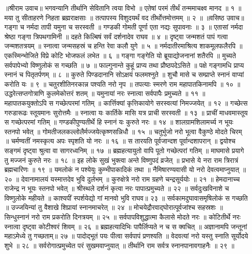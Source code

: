 ॥श्रीराम उवाच॥
भगवन्यानि तीर्थानि सेवितानि त्वया विभो ॥
एतेषां परमं तीर्थं तन्ममाचक्ष्व मानद ॥ १ ॥
मया तु सीताहरणे निहता ब्रह्मराक्षसाः ॥
तत्पापस्य विशुदयर्थं वद तीर्थोत्तमोत्तमम् ॥ २ ॥
॥वसिष्ठ उवाच॥
गङ्गा च नर्मदा तापी यमुना च सरस्वती ॥
गण्डकी गोमती पूर्णा एता नद्यः सुपावनाः ॥ ३ ॥
एतासां नर्मदा श्रेष्ठा गङ्गा त्रिपथगामिनी ॥
दहते किल्बिषं सर्वं दर्शनादेव राघव ॥ ४ ॥
दृष्ट्वा जन्मशतं पापं गत्वा जन्मशतत्रयम् ॥
स्नात्वा जन्मसहस्रं च हन्ति रेवा कलौ युगे ॥ ५ ॥
नर्मदातीरमाश्रित्य शाकमूलफलैरपि ॥
एकस्मिन्भोजिते विप्रे कोटि भोजफलं लभेत ॥ ६ ॥
गङ्गा गङ्गेति यो ब्रूयाद्योजनानां शतैरपि ॥
मुच्यते सर्वपापेभ्यो विष्णुलोकं स गच्छति ॥ ७ ॥
फाल्गुनान्ते कुहूं प्राप्य तथा प्रौष्ठपदेऽसिते ॥
पक्षे गङ्गामधि प्राप्य स्नानं च पितृतर्पणम् ॥ ८ ॥
कुरुते पिण्डदानानि सोऽक्षयं फलमश्नुते ॥
शुचौ मासे च सम्प्राप्ते स्नानं वाप्यां करोति यः ॥ ९ ॥
चतुरशीतिनरकान्न पश्यति नरो नृप ॥
तपत्याः स्मरणे राम महापातकिनामपि ॥ १० ॥
उद्धरेत्सप्तगोत्राणि कुलमेकोत्तरं शतम् ॥
यमुनायां नरः स्नात्वा सर्वपापैः प्रमुच्यते ॥ ११ ॥
महापातकयुक्तोऽपि स गच्छेत्परमां गतिम् ॥
कार्त्तिक्यां कृत्तिकायोगे सरस्वत्यां निमज्जयेत् ॥ १२ ॥
गच्छेत्स गरुडारूढः स्तूयमानः सुरोत्तमैः ॥
स्नात्वा यः कार्तिके मासि यत्र प्राची सरस्वती ॥ १३ ॥
प्राचीं माधवमास्तूय स गच्छेत्परमां गतिम् ॥
गण्डकीपुण्यतीर्थे हि स्नानं यः कुरुते नरः ॥ १४ ॥
शालग्रामशिलामर्च्य न भूयः स्तनपो भवेत् ॥
गोमतीजलकल्लोलैर्मज्जयेत्कृष्णसन्निधौ ॥ १५ ॥
चतुर्भुजो नरो भूत्वा वैकुण्ठे मोदते चिरम् ॥
चर्मण्वतीं नमस्कृत्य अपः स्पृशति यो नरः ॥ १६ ॥
स तारयति पूर्वजान्दश पूर्वान्दशापरान् ॥
द्वयोश्च सङ्गमं दृष्ट्वा श्रुत्वा वा सागरध्वनिम् ॥ १७ ॥
ब्रह्महत्यायुतो वापि पूतो गच्छेत्परां गतिम् ॥
माघमासे प्रयागे तु मज्जनं कुरुते नरः ॥ १८ ॥
इह लोके सुखं भुक्त्वा अन्ते विष्णुपदं व्रजेत् ॥
प्रभासे ये नरा राम त्रिरात्रं ब्रह्मचारिणः ॥ १९ ॥
यमलोकं न पश्येयुः कुम्भीपाकादिकं तथा ॥
नैमिषारण्यवासी यो नरो देवत्वमाप्नुयात् ॥ २० ॥
देवानामालयं यस्मात्तदेव भुवि दुर्लभम् ॥
कुरुक्षेत्रे नरो राम ग्रहणे चन्द्रसूर्ययोः ॥ २१ ॥
हेमदानाच्च राजेन्द्र न भूयः स्तनपो भवेत् ॥
श्रीस्थले दर्शनं कृत्वा नरः पापात्प्रमुच्यते ॥ २२ ॥
सर्वदुःखविनाशे च विष्णुलोके महीयते ॥
काश्यपीं स्पर्शयेद्यो गां मानवो भुवि राघव॥ २३ ॥
सर्वकामदुघावासमृषिलोकं स गच्छति ॥
उज्जयिन्यां तु वैशाखे शिप्रायां स्नानमाचरेत् ॥ २४ ॥
मोचयेद्रौरवाद्घोरात्पूर्वजांश्च सहस्रशः ॥
सिन्धुस्नानं नरो राम प्रकरोति दिनत्रयम् ॥ २५ ॥
सर्वपापविशुद्धात्मा कैलासे मोदते नरः ॥
कोटितीर्थे नरः स्नात्वा दृष्ट्वा कोटीश्वरं शिवम् ॥ २६ ॥
ब्रह्महत्यादिभिः पापैर्लिप्यते न च स क्वचित् ॥
अज्ञानामपि जन्तूनां महाऽमेध्ये तु गच्छताम्॥ २७ ॥
पादोद्भूतं पयः पीत्वा सर्वपापं प्रणश्यति ॥
वेदवत्यां नरो यस्तु स्नाति सूर्योदये शुभे ॥ २८ ॥
सर्वरोगात्प्रमुच्येत परं सुखमवाप्नुयात् ॥
तीर्थानि राम सर्वत्र स्नानपानावगाहनैः ॥ २९ ॥
